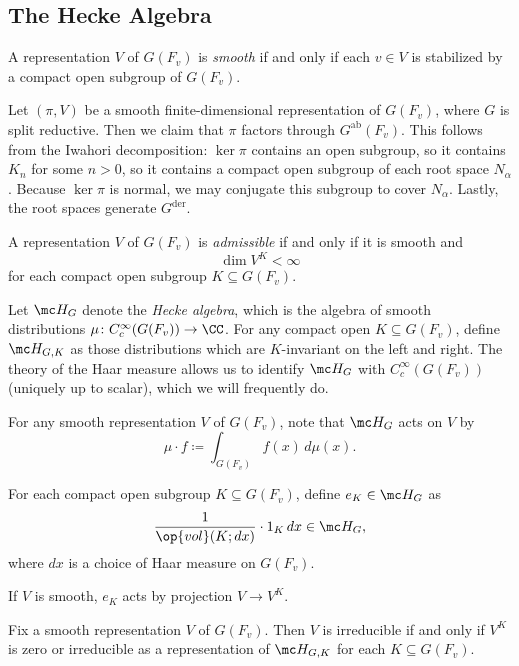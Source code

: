 \documentclass{article}
\begin{document}
\subsection{The Hecke Algebra}
\begin{definition}[smooth]
	A representation $V$ of $G(F_v)$ is \textit{smooth} if and only if each $v\in V$ is stabilized by a compact open subgroup of $G(F_v)$.
\end{definition}
\begin{remark}
	Let $(\pi,V)$ be a smooth finite-dimensional representation of $G(F_v)$, where $G$ is split reductive. Then we claim that $\pi$ factors through $G^{\mathrm{ab}}(F_v)$. This follows from the Iwahori decomposition: $\ker\pi$ contains an open subgroup, so it contains $K_n$ for some $n>0$, so it contains a compact open subgroup of each root space $N_\alpha$. Because $\ker\pi$ is normal, we may conjugate this subgroup to cover $N_\alpha$. Lastly, the root spaces generate $G^{\mathrm{der}}$.
\end{remark}
\begin{definition}[admissible]
	A representation $V$ of $G(F_v)$ is \textit{admissible} if and only if it is smooth and
	\[\dim V^K<\infty\]
	for each compact open subgroup $K\subseteq G(F_v)$.
\end{definition}
\begin{definition}
	Let $\mc H_G$ denote the \textit{Hecke algebra}, which is the algebra of smooth distributions $\mu\colon C_c^\infty(G(F_v))\to\CC$. For any compact open $K\subseteq G(F_v)$, define $\mc H_{G,K}$ as those distributions which are $K$-invariant on the left and right. The theory of the Haar measure allows us to identify $\mc H_G$ with $C_c^\infty(G(F_v))$ (uniquely up to scalar), which we will frequently do.
\end{definition}
\begin{remark}
	For any smooth representation $V$ of $G(F_v)$, note that $\mc H_G$ acts on $V$ by
	\[\mu\cdot f\coloneqq\int_{G(F_v)}f(x)\,d\mu(x).\]
\end{remark}
\begin{notation}
	For each compact open subgroup $K\subseteq G(F_v)$, define $e_K\in\mc H_G$ as
	\[\frac1{\op{vol}(K;dx)}\cdot1_K\,dx\in\mc H_G,\]
	where $dx$ is a choice of Haar measure on $G(F_v)$.
\end{notation}
\begin{remark}
	If $V$ is smooth, $e_K$ acts by projection $V\to V^K$.
\end{remark}
\begin{lemma}
	Fix a smooth representation $V$ of $G(F_v)$. Then $V$ is irreducible if and only if $V^K$ is zero or irreducible as a representation of $\mc H_{G,K}$ for each $K\subseteq G(F_v)$.
\end{lemma}
\end{document}
